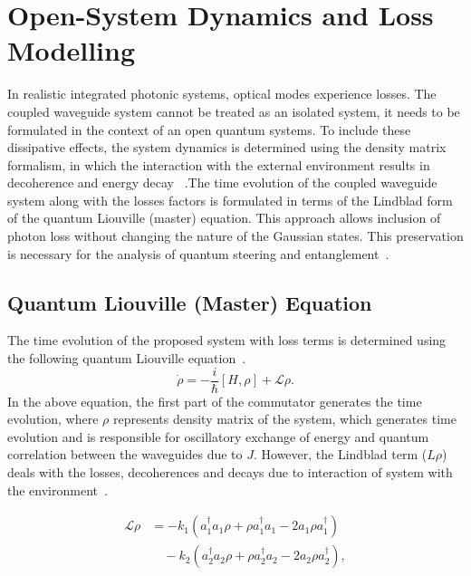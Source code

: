 \section{Open-System Dynamics and Loss Modelling}
In realistic integrated photonic systems, optical modes experience losses. The coupled waveguide system cannot be treated as an isolated
system, it needs to be formulated in the context of an open quantum
systems. To include these dissipative effects, the system dynamics is determined using the density matrix formalism, in which the interaction with the external environment results in decoherence and energy decay~\cite{BreuerPetruccione2002,Rai2010}
.The time evolution of the coupled waveguide system along with the losses factors is formulated in terms of the Lindblad form of the quantum Liouville (master) equation. This approach allows inclusion of photon loss without changing the nature of the Gaussian states. This preservation is necessary for the analysis of quantum steering and entanglement~\cite{BreuerPetruccione2002,GardinerZoller2004,Weedbrook2012,Rai2010}.

\subsection{Quantum Liouville (Master) Equation}
The time evolution of the proposed system with loss terms is determined using the following quantum Liouville equation~\cite{BreuerPetruccione2002,GardinerZoller2004}.
\begin{equation}
	\dot{\rho} = -\frac{i}{\hbar}[H, \rho] + \mathcal{L}\rho.
\end{equation}
In the above equation, the first part of the commutator generates the time evolution, where $\rho$ represents density matrix of the system, which generates time evolution and is responsible for oscillatory exchange of energy and quantum correlation
between the waveguides due to $J$. However, the Lindblad term ($L\rho$) deals with the losses, decoherences and decays due to interaction of system with the environment~\cite{BreuerPetruccione2002,Rai2010}.

\begin{align}
	\mathcal{L}\rho
	&= -k_1\left(a_1^\dagger a_1\rho + \rho a_1^\dagger a_1 - 2a_1\rho a_1^\dagger\right)
	\nonumber\\
	&\quad -k_2\left(a_2^\dagger a_2\rho + \rho a_2^\dagger a_2 - 2a_2\rho a_2^\dagger\right),
\end{align}

